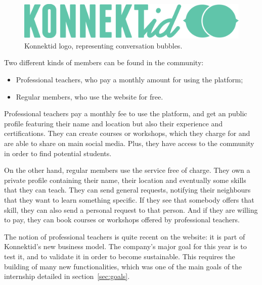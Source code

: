 \begin{figure}[h]
    \centering
    \includegraphics[scale=0.6]{figure/logo_konnektid.png}
    \caption{Konnektid logo, representing conversation bubbles.}
    \label{fig:logo}
\end{figure}

Two different kinds of members can be found in the community:

\begin{itemize}[noitemsep]
    \item Professional teachers, who pay a monthly amount for using the platform;
    \item Regular members, who use the website for free.
\end{itemize}

Professional teachers pay a monthly fee to use the platform, and get an public profile featuring their name and location but also their experience and certifications.
They can create courses or workshops, which they charge for and are able to share on main social media.
Plus, they have access to the community in order to find potential students.

On the other hand, regular members use the service free of charge. They own a private profile containing their name, their location and eventually some skills that they can teach.
They can send general requests, notifying their neighbours that they want to learn something specific.
If they see that somebody offers that skill, they can also send a personal request to that person.
And if they are willing to pay, they can book courses or workshops offered by professional teachers.

The notion of professional teachers is quite recent on the website: it is part of Konnektid's new business model.
The company's major goal for this year is to test it, and to validate it in order to become sustainable.
This requires the building of many new functionalities, which was one of the main goals of the internship detailed in {\sc section}~\ref{sec:goals}.
